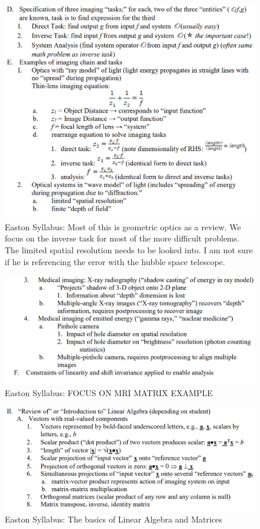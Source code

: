 \documentclass{article}
\begin{document}
\begin{figure}[h!]
\centering
\includegraphics[scale=.60]{Fourier/Week 1/Week1.2.png}
\caption{Easton Syllabus: Most of this is geometric optics as a review. We focus on the inverse task for most of the more difficult problems. The limited spatial resolution needs to be looked into. I am not sure if he is referencing the error with the hubble space telescope.}
\label{fig:Snowma2n}
\end{figure}

\begin{figure}[h!]
\centering
\includegraphics[scale=.65]{Fourier/Week 1/Week1.3.png}
\caption{Easton Syllabus: FOCUS ON MRI MATRIX EXAMPLE}
\label{fig:Snowman2}
\end{figure}

\begin{figure}[h!]
\centering
\includegraphics[scale=.65]{Fourier/Week 1/Week1.4.png}
\caption{Easton Syllabus: The basics of Linear Algebra and Matrices}
\label{fig:Snowman3}
\end{figure}
\end{document}
